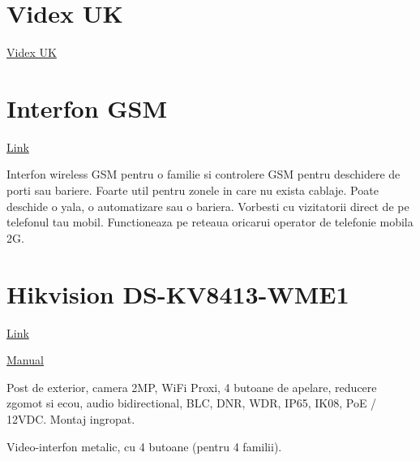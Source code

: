 \section {Videx UK}

\href{https://www.videxuk.com/system/gsm-intercoms/}{Videx UK}


\section {Interfon GSM}

\href{https://www.a2t.ro/interfoane-videointerfoane/interfon-wireless-gsm-pentru-o-familie.html}{Link}

Interfon wireless GSM pentru o familie si controlere GSM pentru deschidere de porti sau bariere. Foarte util pentru zonele in care nu exista cablaje. Poate deschide o yala, o automatizare sau o bariera. Vorbesti cu vizitatorii direct de pe telefonul tau mobil. Functioneaza pe reteaua oricarui operator de telefonie mobila 2G.

\section {Hikvision DS-KV8413-WME1}

\href{https://www.a2t.ro/videointerfon-wireless/videointerfon-full-hd-4-familii-control-acces-aplicat-tcp-ip-hikvision-ds-kv8413-wme1-s.html}{Link}

\href{https://www.hikvision.com/content/dam/hikvision/products/S000000001/S000000083/S000000129/S000000131/OFR000170/M000048926/User_Manual/UD20207B_Baseline_Video-Intercom-8-Series-Villa-Door-Station_User-Manual_V2.2.3.PDF}{Manual}


Post de exterior, camera 2MP, WiFi Proxi, 4 butoane de apelare, reducere zgomot si ecou, audio bidirectional, BLC, DNR, WDR, IP65, IK08, PoE / 12VDC. Montaj ingropat.

Video-interfon metalic, cu 4 butoane (pentru 4 familii).